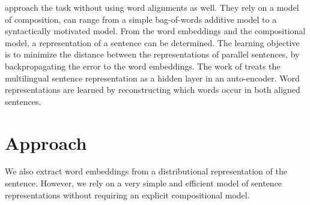 \documentclass[a4paper,11pt]{article}
\begin{document}
\cite{hermann2014multilingual} approach the task without using word alignments as well. They rely on a model of composition, can range from a simple bag-of-words additive model to a syntactically motivated model. From the word embeddings and the compositional model, a representation of a sentence can be determined. The learning objective is to minimize the distance between the representations of parallel sentences, by backpropagating the error to the word embeddings.
The work of \cite{sarath2014autoencoder} treats the multilingual sentence representation as a hidden layer in an auto-encoder. Word representations are learned by reconstructing which words occur in both aligned sentences. 





\section*{Approach}


We also extract word embeddings from a distributional representation of the sentence. However, we rely on a very simple and efficient model of sentence representations without requiring an explicit compositional model. 
\end{document}

